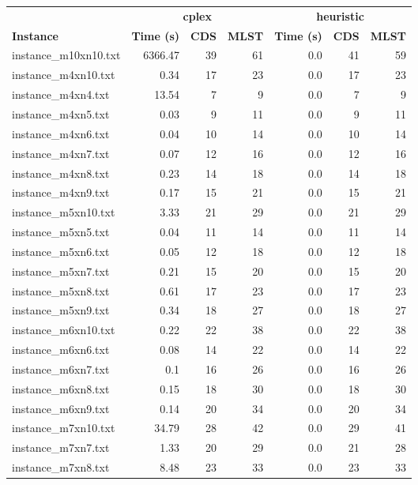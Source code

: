 \documentclass{article}
\begin{document}
\begin{center}
\renewcommand{\arraystretch}{1.4}
 \begin{tabular}{lrrrrrr}
	\hline
 & \multicolumn{3}{c}{\textbf{cplex}} & \multicolumn{3}{c}{\textbf{heuristic}}\\
\textbf{Instance}  & \textbf{Time (s)} & \textbf{CDS} & \textbf{MLST}   & \textbf{Time (s)} & \textbf{CDS} & \textbf{MLST}  \\\hline

instance\_m10xn10.txt & 6366.47 & 39 & 61
 & 0.0 & 41 & 59
\\
instance\_m4xn10.txt & 0.34 & 17 & 23
 & 0.0 & 17 & 23
\\
instance\_m4xn4.txt & 13.54 & 7 & 9
 & 0.0 & 7 & 9
\\
instance\_m4xn5.txt & 0.03 & 9 & 11
 & 0.0 & 9 & 11
\\
instance\_m4xn6.txt & 0.04 & 10 & 14
 & 0.0 & 10 & 14
\\
instance\_m4xn7.txt & 0.07 & 12 & 16
 & 0.0 & 12 & 16
\\
instance\_m4xn8.txt & 0.23 & 14 & 18
 & 0.0 & 14 & 18
\\
instance\_m4xn9.txt & 0.17 & 15 & 21
 & 0.0 & 15 & 21
\\
instance\_m5xn10.txt & 3.33 & 21 & 29
 & 0.0 & 21 & 29
\\
instance\_m5xn5.txt & 0.04 & 11 & 14
 & 0.0 & 11 & 14
\\
instance\_m5xn6.txt & 0.05 & 12 & 18
 & 0.0 & 12 & 18
\\
instance\_m5xn7.txt & 0.21 & 15 & 20
 & 0.0 & 15 & 20
\\
instance\_m5xn8.txt & 0.61 & 17 & 23
 & 0.0 & 17 & 23
\\
instance\_m5xn9.txt & 0.34 & 18 & 27
 & 0.0 & 18 & 27
\\
instance\_m6xn10.txt & 0.22 & 22 & 38
 & 0.0 & 22 & 38
\\
instance\_m6xn6.txt & 0.08 & 14 & 22
 & 0.0 & 14 & 22
\\
instance\_m6xn7.txt & 0.1 & 16 & 26
 & 0.0 & 16 & 26
\\
instance\_m6xn8.txt & 0.15 & 18 & 30
 & 0.0 & 18 & 30
\\
instance\_m6xn9.txt & 0.14 & 20 & 34
 & 0.0 & 20 & 34
\\
instance\_m7xn10.txt & 34.79 & 28 & 42
 & 0.0 & 29 & 41
\\
instance\_m7xn7.txt & 1.33 & 20 & 29
 & 0.0 & 21 & 28
\\
instance\_m7xn8.txt & 8.48 & 23 & 33
 & 0.0 & 23 & 33
\\

\end{tabular}
\end{center}
\end{document}
